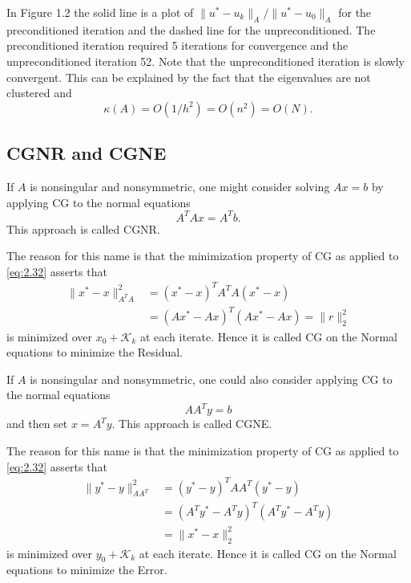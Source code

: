 \begin{exm}
   In Figure 1.2 the solid line is a plot of $\|u^*-u_k\|_A/\|u^*-u_0\|_A$
  for the preconditioned iteration and the dashed line for the
  unpreconditioned.  The preconditioned iteration required 5
  iterations for convergence and the unpreconditioned iteration
  52. Note that the unpreconditioned iteration is slowly 
  convergent. This can be explained by the fact that the eigenvalues
  are not clustered and $$\kappa(A)=O(1/h^2)=O(n^2)=O(N).$$
\end{exm}

\subsection{CGNR and CGNE}
\label{sec:2.6}

\begin{defi}
  If $A$ is nonsingular and nonsymmetric, one might consider solving
  $Ax=b$ by applying CG to the normal equations
  \begin{equation}
    \label{eq:2.32}
    A^TAx=A^Tb.
  \end{equation}
  This approach is called CGNR.
\end{defi}

\begin{rmk}
  The reason for this name is that the minimization property of CG as
  applied to \eqref{eq:2.32} asserts that
  \begin{equation*}
    \begin{aligned}
      \|x^*-x\|^2_{A^TA}&=(x^*-x)^TA^TA(x^*-x) \\
      &=(Ax^*-Ax)^T(Ax^*-Ax)=\|r\|^2_2
    \end{aligned}
  \end{equation*}
  is minimized over $x_0+\mathcal{K}_k$ at each iterate. Hence it is
  called CG on the Normal equations to minimize the Residual.
\end{rmk}

\begin{defi}
  If $A$ is nonsingular and nonsymmetric, one could also consider
  applying CG to the normal equations
  \begin{equation}
    \label{eq:2.32}
    AA^Ty=b
  \end{equation}
  and then set $x=A^Ty$. This approach is called CGNE.
\end{defi}

\begin{rmk}
  The reason for this name is that the minimization property of CG as
  applied to \eqref{eq:2.32} asserts that
  \begin{equation*}
    \begin{aligned}
      \|y^*-y\|^2_{AA^T}&=(y^*-y)^TAA^T(y^*-y) \\
      &=(A^Ty^*-A^Ty)^T(A^Ty^*-A^Ty)\\&=\|x^*-x\|_2^2
    \end{aligned}
  \end{equation*}
  is minimized over $y_0+\mathcal{K}_k$ at each iterate. Hence it is
  called CG on the Normal equations to minimize the Error.
\end{rmk}

